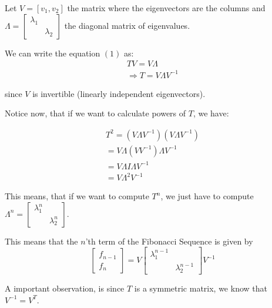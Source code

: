 \documentclass{article}
\begin{document}
Let $V = [v_1 , v_2]$ the matrix where the eigenvectors are the columns and $\Lambda = \begin{bmatrix}
    \lambda_1 & \\
    & \lambda_2
\end{bmatrix}$ the diagonal matrix of eigenvalues.

We can write the equation $(1)$ as:
\begin{equation*}
    \begin{aligned}
        TV = V\Lambda\\
        \Rightarrow T = V \Lambda V^{-1}
    \end{aligned}
\end{equation*}

since $V$ is invertible (linearly independent eigenvectors).

Notice now, that if we want to calculate powers of $T$, we have:

\begin{equation*}
    \begin{aligned}
        T^2 = (V\Lambda V^{-1})(V\Lambda V^{-1})\\
        = V\Lambda (VV^{-1})\Lambda V^{-1}\\
        = V \Lambda I \Lambda V^{-1} \\
        =V \Lambda^2 V^{-1}
    \end{aligned}
\end{equation*}

This means, that if we want to compute $T^n$, we just have to compute \\
$\Lambda ^n = \begin{bmatrix}
    \lambda_1 ^n & \\
    & \lambda_2 ^n
\end{bmatrix}$.

This means that the $n$'th term of the Fibonacci Sequence is given by
\begin{equation*}
    \begin{bmatrix}
        f_{n - 1}\\
        f_n
    \end{bmatrix} = V \begin{bmatrix}
        \lambda_1 ^{n - 1} & \\
    & \lambda_2 ^{n - 1}
    \end{bmatrix}V^{-1}
\end{equation*}

A important observation, is since $T$ is a symmetric matrix, we know that $V^{-1} = V^T$.
\end{document}
